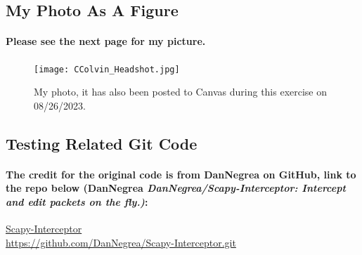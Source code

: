 \subsection{My Photo As A  Figure}
\paragraph{\quad Please see the next page for my picture.}
\begin{figure}[ht!]
\centering
\caption{\label{fig:CColvin_Headshot} My photo, it has also been posted to Canvas during this exercise on 08/26/2023.}
\texttt{[image: CColvin\_Headshot.jpg]}
\end{figure}
\clearpage
\subsection{Testing Related Git Code}
\paragraph{\quad The credit for the original code is from DanNegrea on GitHub, link to the repo below (DanNegrea \textit{DanNegrea/Scapy-Interceptor: Intercept and edit packets on the fly.)}:}
\hfill \break
\href{https://github.com/DanNegrea/Scapy-Interceptor.git}
{Scapy-Interceptor}
\\
\url{https://github.com/DanNegrea/Scapy-Interceptor.git}

